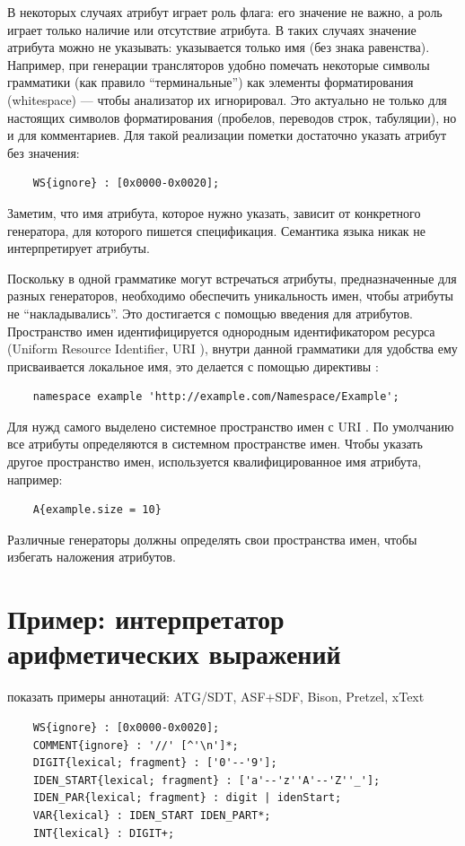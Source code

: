 В некоторых случаях атрибут играет роль флага: его значение не важно, а роль играет только наличие или отсутствие атрибута. В таких случаях значение атрибута можно не указывать: указывается только имя (без знака равенства). Например, при генерации трансляторов удобно помечать некоторые символы грамматики (как правило ``терминальные'') как элементы форматирования (whitespace) --- чтобы анализатор их игнорировал. Это актуально не только для настоящих символов форматирования (пробелов, переводов строк, табуляции), но и для комментариев. Для такой реализации пометки достаточно указать атрибут без значения:
\begin{lstlisting}
	WS{ignore} : [0x0000-0x0020];
\end{lstlisting}
Заметим, что имя атрибута, которое нужно указать, зависит от конкретного генератора, для которого пишется спецификация. Семантика языка  никак не интерпретирует атрибуты.

Поскольку в одной грамматике могут встречаться атрибуты, предназначенные для разных генераторов, необходимо обеспечить уникальность имен, чтобы атрибуты не ``накладывались''. Это достигается с помощью введения  для атрибутов. Пространство имен идентифицируется однородным идентификатором ресурса (Uniform Resource Identifier, URI \cite{???}), внутри данной грамматики для удобства ему присваивается локальное имя, это делается с помощью директивы :
\begin{lstlisting}
	namespace example 'http://example.com/Namespace/Example';
\end{lstlisting}
Для нужд самого  выделено системное пространство имен  с URI . По умолчанию все атрибуты определяются в системном пространстве имен. Чтобы указать другое пространство имен, используется квалифицированное имя атрибута, например:
\begin{lstlisting}
	A{example.size = 10}
\end{lstlisting}
Различные генераторы должны определять свои пространства имен, чтобы избегать наложения атрибутов.

\section{Пример: интерпретатор арифметических выражений}

показать примеры аннотаций: ATG/SDT, ASF+SDF, Bison, Pretzel, xText

\begin{lstlisting}
	WS{ignore} : [0x0000-0x0020];
	COMMENT{ignore} : '//' [^'\n']*;
	DIGIT{lexical; fragment} : ['0'--'9'];
	IDEN_START{lexical; fragment} : ['a'--'z''A'--'Z''_'];
	IDEN_PAR{lexical; fragment} : digit | idenStart;
	VAR{lexical} : IDEN_START IDEN_PART*;
	INT{lexical} : DIGIT+;
\end{lstlisting}

